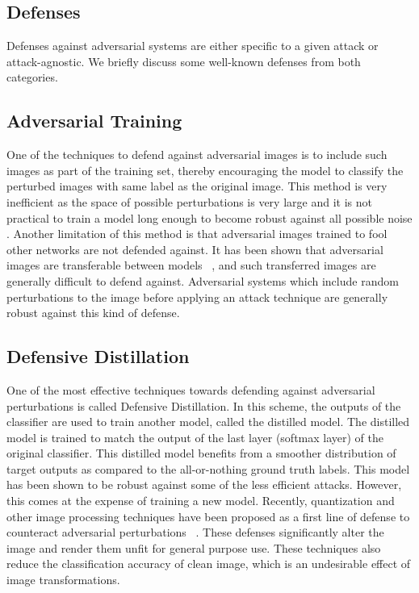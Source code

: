 \subsection{Defenses} \label{defenses}
Defenses against adversarial systems are either specific to a given attack or attack-agnostic. 
We briefly discuss some well-known defenses from both categories.

\subsection{Adversarial Training}
One of the techniques to defend against adversarial images is to include such images as part of the training set, thereby encouraging the model to classify the perturbed images with same label as the original image. 
This method is very inefficient as the space of possible perturbations is very large and it is not practical to train
a model long enough to become robust against all possible noise \cite{Tramr2017TheSO}. 
Another limitation of this method is that adversarial images trained to fool other networks are not defended against. 
It has been shown that adversarial images are transferable between models ~\cite{Liu2016DelvingIT}, and such transferred images are generally difficult to defend against.
Adversarial systems which include random perturbations to the image before applying an attack technique are generally robust against
this kind of defense.

\subsection{Defensive Distillation}
One of the most effective techniques towards defending against adversarial perturbations is called Defensive Distillation.
In this scheme, the outputs of the classifier are used to train another model, called the distilled model. 
The distilled model is trained to match the output of the last layer (softmax layer) of the original classifier.
This distilled model benefits from a smoother distribution of target outputs as compared to the all-or-nothing ground truth labels.
This model has been shown to be robust against some of the less efficient attacks.
However, this comes at the expense of training a new model.
Recently, quantization and other image processing techniques have been proposed as a first line of defense to counteract adversarial perturbations ~\cite{liang2017detecting,aadityaprakash2018,guo2017countering}. 
These defenses significantly alter the image and render them unfit for general purpose use.
These techniques also reduce the classification accuracy of clean image, which is an undesirable effect of image transformations.

